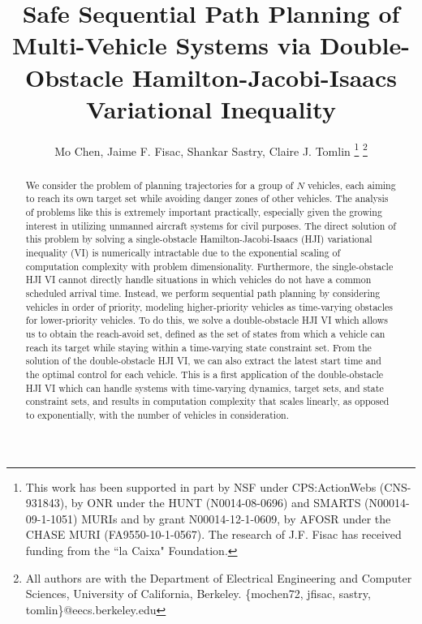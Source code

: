 \documentclass[letterpaper, 10pt, conference]{ieeeconf}      %
\title{\LARGE \bf
Safe Sequential Path Planning of Multi-Vehicle Systems via Double-Obstacle Hamilton-Jacobi-Isaacs Variational Inequality}
\author{Mo Chen, Jaime F. Fisac, Shankar Sastry, Claire J. Tomlin
\thanks{This work has been supported in part by NSF under CPS:ActionWebs (CNS-931843), by ONR under the HUNT (N0014-08-0696) and SMARTS (N00014-09-1-1051) MURIs and by grant N00014-12-1-0609, by AFOSR under the CHASE MURI (FA9550-10-1-0567). The research of J.F. Fisac has received funding from the ``la Caixa" Foundation.}
\thanks{All authors are with the Department of Electrical Engineering and Computer Sciences, University of California, Berkeley. \{mochen72, jfisac, sastry, tomlin\}@eecs.berkeley.edu}
}
\begin{document}
\maketitle
\thispagestyle{empty}
\pagestyle{empty}

\begin{abstract}
We consider the problem of planning trajectories for a group of $N$ vehicles, each aiming to reach its own target set while avoiding danger zones of other vehicles. The analysis of problems like this is extremely important practically, especially given the growing interest in utilizing unmanned aircraft systems for civil purposes. The direct solution of this problem by solving a single-obstacle Hamilton-Jacobi-Isaacs (HJI) variational inequality (VI) is numerically intractable due to the exponential scaling of computation complexity with problem dimensionality. Furthermore, the single-obstacle HJI VI cannot directly handle situations in which vehicles do not have a common scheduled arrival time. Instead, we perform sequential path planning  by considering vehicles in order of priority, modeling higher-priority vehicles as time-varying obstacles for lower-priority vehicles. To do this, we solve a double-obstacle HJI VI which allows us to obtain the reach-avoid set, defined as the set of states from which a vehicle can reach its target while staying within a time-varying state constraint set. From the solution of the double-obstacle HJI VI, we can also extract the latest start time and the optimal control for each vehicle. This is a first application of the double-obstacle HJI VI which can handle systems with time-varying dynamics, target sets, and state constraint sets, and results in computation complexity that scales linearly, as opposed to exponentially, with the number of vehicles in consideration.
\end{abstract}








\end{document}
